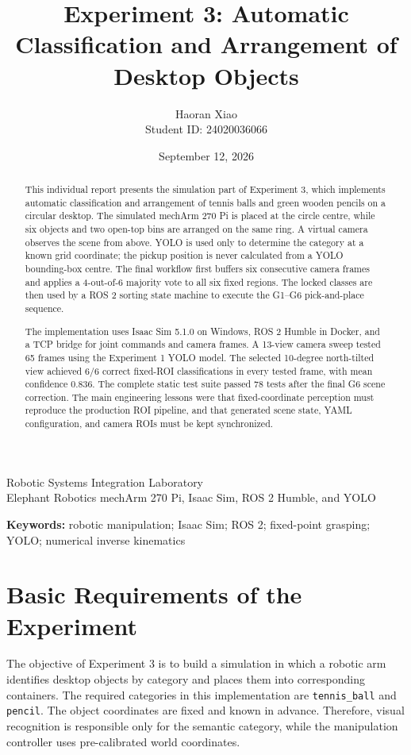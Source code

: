 \documentclass[12pt,a4paper]{article}
\title{\textbf{Experiment 3: Automatic Classification and Arrangement of Desktop Objects}}
\author{Haoran Xiao\\Student ID: 24020036066}
\date{September 12, 2026}
\begin{document}
\maketitle
\thispagestyle{empty}
\begin{center}
Robotic Systems Integration Laboratory\\
Elephant Robotics mechArm 270 Pi, Isaac Sim, ROS 2 Humble, and YOLO
\end{center}
\vfill
\begin{abstract}
This individual report presents the simulation part of Experiment 3, which implements automatic classification and arrangement of tennis balls and green wooden pencils on a circular desktop. The simulated mechArm 270 Pi is placed at the circle centre, while six objects and two open-top bins are arranged on the same ring. A virtual camera observes the scene from above. YOLO is used only to determine the category at a known grid coordinate; the pickup position is never calculated from a YOLO bounding-box centre. The final workflow first buffers six consecutive camera frames and applies a 4-out-of-6 majority vote to all six fixed regions. The locked classes are then used by a ROS 2 sorting state machine to execute the G1--G6 pick-and-place sequence.

The implementation uses Isaac Sim 5.1.0 on Windows, ROS 2 Humble in Docker, and a TCP bridge for joint commands and camera frames. A 13-view camera sweep tested 65 frames using the Experiment 1 YOLO model. The selected 10-degree north-tilted view achieved 6/6 correct fixed-ROI classifications in every tested frame, with mean confidence 0.836. The complete static test suite passed 78 tests after the final G6 scene correction. The main engineering lessons were that fixed-coordinate perception must reproduce the production ROI pipeline, and that generated scene state, YAML configuration, and camera ROIs must be kept synchronized.
\end{abstract}

\noindent\textbf{Keywords:} robotic manipulation; Isaac Sim; ROS 2; fixed-point grasping; YOLO; numerical inverse kinematics

\clearpage
\tableofcontents
\clearpage

\section{Basic Requirements of the Experiment}

The objective of Experiment 3 is to build a simulation in which a robotic arm identifies desktop objects by category and places them into corresponding containers. The required categories in this implementation are \texttt{tennis\_ball} and \texttt{pencil}. The object coordinates are fixed and known in advance. Therefore, visual recognition is responsible only for the semantic category, while the manipulation controller uses pre-calibrated world coordinates.
\end{document}

